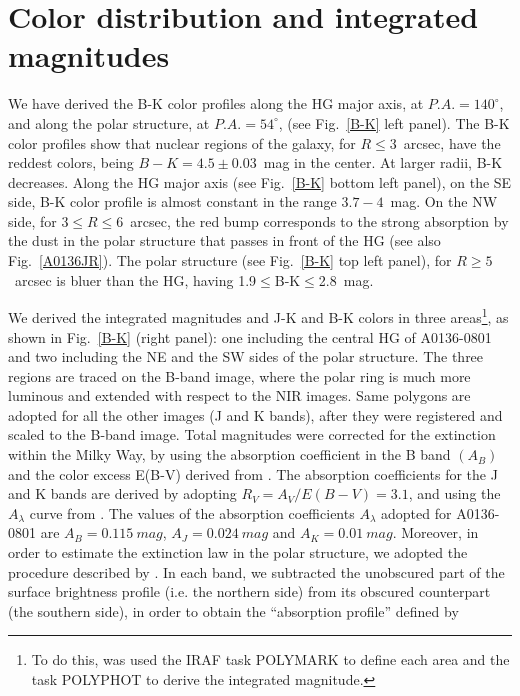 \documentclass[useAMS,usenatbib]{mn2e}
\begin{document}
\section{Color distribution and integrated magnitudes}\label{colors}

We have derived the B-K color profiles along the HG major axis, at
$P.A.=140^{\circ}$, and along the polar structure, at
$P.A.=54^{\circ}$, (see Fig.~\ref{B-K} left panel). The B-K color profiles show that nuclear
regions of the galaxy, for $R \le 3$~arcsec, have the reddest colors,
being $B-K=4.5\pm 0.03$~mag in the center. At larger radii, B-K
decreases. Along the HG major axis (see Fig.~\ref{B-K} bottom left
panel), on the SE side, B-K color profile is almost constant in the
range $3.7-4$~mag. On the NW side, for $3 \le R \le 6$~arcsec, the red
bump corresponds to the strong absorption by the dust in the polar
structure that passes in front of the HG (see also
Fig.~\ref{A0136JR}). The polar structure (see Fig.~\ref{B-K} top left
panel), for $R \ge 5$~arcsec is bluer than the HG, having
1.9$\le$B-K$\le$2.8~mag.

We derived the integrated magnitudes and J-K and B-K colors in three
areas\footnote{To do this, was used the IRAF task {\small POLYMARK} to
  define each area and the task {\small POLYPHOT} to derive the
  integrated magnitude.}, as shown in Fig.~\ref{B-K} (right panel): one
  including the central HG of A0136-0801 and two including the NE and
  the SW sides of the polar structure.  The three regions are traced
  on the B-band image, where the polar ring is much more luminous and
  extended with respect to the NIR images. Same polygons are adopted
  for all the other images (J and K bands), after they were registered
  and scaled to the B-band image. 
  Total magnitudes were corrected for the extinction
  within the Milky Way, by using the absorption coefficient in the B
  band $(A_{B})$ and the color excess E(B-V) derived from
  \citet{Schlegel98}. The absorption coefficients for the J and K
  bands are derived by adopting $R_{V}=A_{V}/E(B-V)=3.1$, and using
  the $A_{\lambda}$ curve from \citet{Car89}. The values of the
  absorption coefficients $A_{\lambda}$ adopted for A0136-0801 are
  $A_{B} = 0.115\ mag$, $A_{J} = 0.024\ mag$ and $A_{K} = 0.01\
  mag$. Moreover, in order to estimate the extinction law in the polar
  structure, we adopted the procedure described by \citet{Iod04}. In
  each band, we subtracted the unobscured part of the surface
  brightness profile (i.e. the northern side) from its obscured
  counterpart (the southern side), in order to obtain the ``absorption
  profile'' defined by
  
\end{document}
